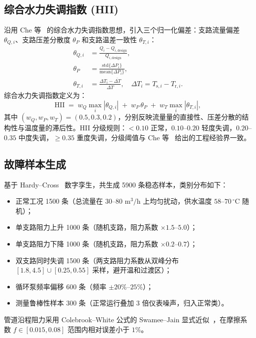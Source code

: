 \documentclass[11pt,a4paper]{ctexart}
\begin{document}
\subsection{综合水力失调指数 (HII)}
沿用 Che 等~\cite{che2023} 的综合水力失调指数思想，引入三个归一化偏差：支路流量偏差 $\theta_{Q,i}$、支路压差分散度 $\theta_P$ 和支路温差一致性 $\theta_{T,i}$：
\begin{align}
\theta_{Q,i} &= \frac{Q_i - Q_{i,\mathrm{design}}}{Q_{i,\mathrm{design}}}, \\[2pt]
\theta_P &= \frac{\mathrm{std}\{\Delta P_i\}}{\mathrm{mean}\{\Delta P_i\}}, \\[2pt]
\theta_{T,i} &= \frac{\Delta T_i - \overline{\Delta T}}{\overline{\Delta T}}, \quad \Delta T_i = T_{\mathrm{s},i}-T_{\mathrm{r},i}.
\end{align}
综合水力失调指数定义为：
\begin{equation}
\mathrm{HII} \;=\; w_Q \max_i |\theta_{Q,i}| \;+\; w_P\,\theta_P \;+\; w_T \max_i |\theta_{T,i}|,
\label{eq:hii}
\end{equation}
其中 $(w_Q, w_P, w_T) = (0.5, 0.3, 0.2)$，分别反映流量量的直接性、压差分散的结构性与温度量的滞后性。HII 分级规则：$<0.10$ 正常，$0.10$--$0.20$ 轻度失调，$0.20$--$0.35$ 中度失调，$\geq 0.35$ 重度失调，分级阈值与 Che 等~\cite{che2023} 给出的工程经验界一致。

\subsection{故障样本生成}
基于 Hardy--Cross~\cite{cross1936} 数字孪生，共生成 5900 条稳态样本，类别分布如下：
\begin{itemize}[leftmargin=*,itemsep=1pt]
    \item 正常工况 1500 条（总流量在 30--80 $\mathrm{m^3/h}$ 上均匀扰动，供水温度 $58$--$70\,\mathrm{^\circ C}$ 随机）；
    \item 单支路阻力上升 1000 条（随机支路，阻力系数 $\times 1.5$--$5.0$）；
    \item 单支路阻力下降 1000 条（随机支路，阻力系数 $\times 0.2$--$0.7$）；
    \item 双支路同时失调 1500 条（两支路阻力系数从双峰分布 $[1.8,4.5]\cup[0.25,0.55]$ 采样，避开温和过渡区）；
    \item 循环泵频率偏移 600 条（频率 $\pm 20\%$--$25\%$）；
    \item 测量鲁棒性样本 300 条（正常运行叠加 3 倍仪表噪声，归入正常类）。
\end{itemize}
管道沿程阻力采用 Colebrook--White 公式的 Swamee--Jain 显式近似~\cite{swamee1976}，在摩擦系数 $f\in[0.015,0.08]$ 范围内相对误差小于 $1\%$。
\end{document}

